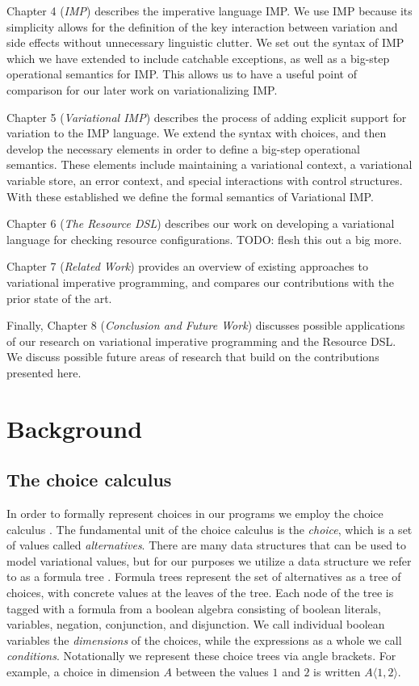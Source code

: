 \documentclass[12pt,oneside]{book}
\newcommand{\tagtree}[3]{#1 \langle #2, #3 \rangle}
\begin{document}
Chapter 4 (\emph{IMP}) describes the imperative language IMP.
We use IMP because its simplicity allows for the definition of the key
interaction between variation and side effects without unnecessary linguistic
clutter. We set out the syntax of IMP which we have extended to include catchable
exceptions, as well as a big-step operational semantics for IMP. This allows us
to have a useful point of comparison for our later work on variationalizing IMP.

Chapter 5 (\emph{Variational IMP}) describes the process of adding explicit support
for variation to the IMP language. We extend the syntax with choices, and then
develop the necessary elements in order to define a big-step operational semantics.
These elements include maintaining a variational context, a variational variable store,
an error context, and special interactions with control structures. With these established
we define the formal semantics of Variational IMP.

Chapter 6 (\emph{The Resource DSL}) describes our work on developing a variational
language for checking resource configurations. TODO: flesh this out a big more.

Chapter 7 (\emph{Related Work}) provides an overview of existing approaches to
variational imperative programming, and compares our contributions with the prior
state of the art.

Finally, Chapter 8 (\emph{Conclusion and Future Work}) discusses possible applications
of our research on variational imperative programming and the Resource DSL. We discuss
possible future areas of research that build on the contributions presented here.


\chapter{Background}
\label{ch:bg}

\section{The choice calculus}

In order to formally represent choices in our programs we employ the choice
calculus \cite{ericthesis,erwig2011choice}. The fundamental unit of the choice calculus is
the \emph{choice}, which is a set of values called \emph{alternatives}.
There are many data structures that can be used to model
variational values, but for our purposes we utilize a data structure we refer
to as a formula tree \cite{walkingshaw2014projectional,walkingshaw2014variational}.
Formula trees represent the set of alternatives as a tree of choices, with concrete
values at the leaves of the tree. Each node of the tree is tagged with a formula from a boolean
algebra consisting of boolean literals, variables, negation, conjunction, and disjunction. We call individual
boolean variables the \emph{dimensions} of the choices, while the expressions as a whole we call \emph{conditions}. Notationally we represent these choice trees
via angle brackets. For example, a choice in dimension $A$
between the values $1$ and $2$ is written $\tagtree{A}{1}{2}$.
\end{document}
